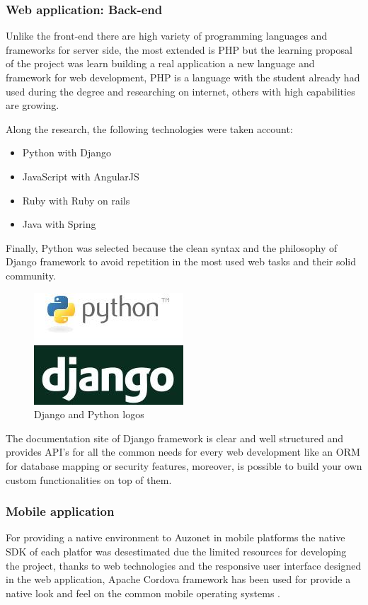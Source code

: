 \documentclass{DeustoFDP}
\begin{document}
\subsubsection{Web application: Back-end}
Unlike the front-end there are high variety of programming languages and frameworks for server side, the most extended is PHP but the learning proposal of the project was learn building a real application a new language and framework for web development, PHP is a language with the student already had used during the degree and researching on internet, others with high capabilities are growing.

Along the research, the following technologies were taken account:
\begin{itemize}
	\item Python with Django
	\item JavaScript with AngularJS
	\item Ruby with Ruby on rails
	\item Java with Spring
\end{itemize}

Finally, Python was selected because the clean syntax and the philosophy of Django framework to avoid repetition in the most used web tasks and their solid community.

\begin{figure}[h]
\centering
\includegraphics[width=0.5\linewidth]{fig/python-django}
\caption[Django and Python logos]{Django and Python logos}
\label{fig:python-django}
\end{figure}


The documentation site of Django framework \cite{Djangodocs} is clear and well structured and provides API's for all the common needs for every web development like an ORM for database mapping or security features, moreover, is possible to build your own custom functionalities on top of them.

\subsubsection{Mobile application}
For providing a native environment to Auzonet in mobile platforms the native SDK of each platfor was desestimated due the limited resources for developing the project, thanks to web technologies and the responsive user interface designed in the web application, Apache Cordova framework has been used for provide a native look and feel on the common mobile operating systems \cite{convertingwebapps}.
\end{document}
